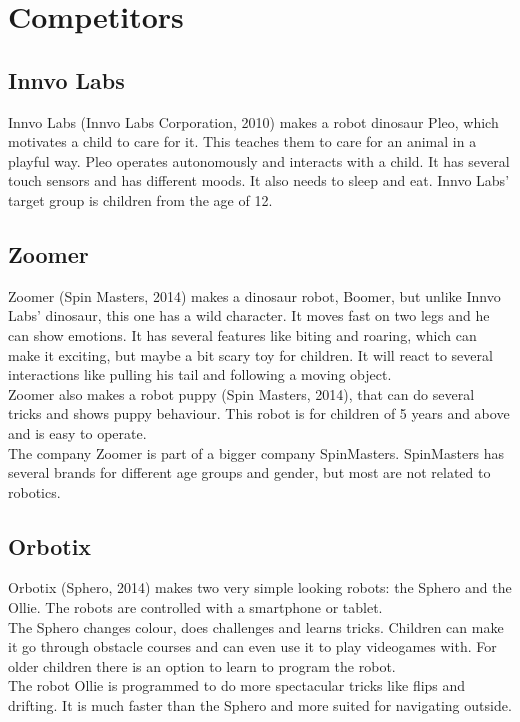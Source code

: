 \documentclass[11pt,twoside,a4paper]{report}
\begin{document}
\begin{appendices}
\label{appendix:software}

\chapter{Competitors}
\label{appendix:competitors}
\section*{Innvo Labs}
Innvo Labs (Innvo Labs Corporation, 2010) makes a robot dinosaur Pleo, which motivates a child to care for it. This teaches them to care for an animal in a playful way. Pleo operates autonomously and interacts with a child. It has several touch sensors and has different moods. It also needs to sleep and eat. Innvo Labs\rq{} target group is children from the age of 12.
\section*{Zoomer}
Zoomer (Spin Masters, 2014) makes a dinosaur robot, Boomer, but unlike Innvo Labs\rq{} dinosaur, this one has a wild character. It moves fast on two legs and he can show emotions. It has several features like biting and roaring, which can make it exciting, but maybe a bit scary toy for children. It will react to several interactions like pulling his tail and following a moving object. \\
Zoomer also makes a robot puppy (Spin Masters, 2014), that can do several tricks and shows puppy behaviour. This robot is for children of 5 years and above and is easy to operate. \\
The company Zoomer is part of a bigger company SpinMasters. SpinMasters has several brands for different age groups and gender, but most are not related to robotics.
\section*{Orbotix}
Orbotix (Sphero, 2014) makes two very simple looking robots: the Sphero and the Ollie. The robots are controlled with a smartphone or tablet. \\
The Sphero changes colour, does challenges and learns tricks. Children can make it go through obstacle courses and can even use it to play videogames with. For older children there is an option to learn to program the robot. \\
The robot Ollie is programmed to do more spectacular tricks like flips and drifting. It is much faster than the Sphero and more suited for navigating outside.

\end{appendices}
\end{document}
